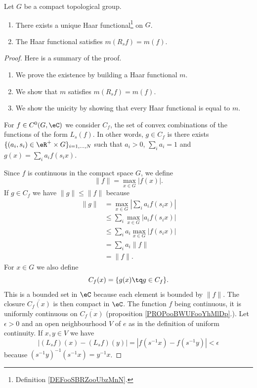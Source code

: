 \begin{theorem}       \label{THOooHZNRooLWmJMB}
	Let \( G\) be a compact topological group.
	\begin{enumerate}
		\item
		      There exists a unique Haar functional\footnote{Definition \ref{DEFooSBRZooUbzMnN}.} on \( G\).
		\item
		      The Haar functional satisfies \( m(R_sf)=m(f)\).
	\end{enumerate}
\end{theorem}

\begin{proof}
	Here is a summary of the proof.
	\begin{enumerate}
		\item
		      We prove the existence by building a Haar functional \( m\).
		\item
		      We show that \( m\) satisfies \( m(R_sf)=m(f)\).
		\item
		      We show the unicity by showing that every Haar functional is equal to \( m\).
	\end{enumerate}

	For \( f\in C^0(G,\eC)\) we consider \( C_f\), the set of convex combinations of the functions of the form \( L_s(f)\). In other words, \( g\in C_f\) is there exists \( \{ (a_i,s_i)\in \eR^+\times G \}_{i=1,\ldots, N}\) such that \( a_i>0\), \( \sum_ia_i=1\) and \( g(x)=\sum_ia_if(s_ix)\).

	Since \( f\) is continuous in the compact space \( G\), we define
	\begin{equation}
		\| f \|=\max_{x\in G}| f(x) |.
	\end{equation}
	If \( g\in C_f\) we have \( \| g \|\leq \| f \|\) because
	\begin{subequations}
		\begin{align}
			\| g \| & =\max_{x\in G}| \sum_ia_if(s_ix) |     \\
			        & \leq\sum_i\max_{x\in G}| a_if(s_ix) |  \\
			        & \leq \sum_ia_i\max_{x\in G}| f(s_ix) | \\
			        & =\sum_ia_i\| f \|                      \\
			        & =\| f \|.
		\end{align}
	\end{subequations}
	For \( x\in G\) we also define
	\begin{equation}
		C_f(x)=\{ g(x)\tq g\in C_f \}.
	\end{equation}
	This is a bounded set in \( \eC\) because each element is bounded by \( \| f \|\). The closure \( \overline{ C_f(x) }\) is then compact in \( \eC\). The function \( f\) being continuous, it is uniformly continuous on \( \overline{ C_f(x) }\) (proposition \ref{PROPooBWUFooYhMlDp}.). Let \( \epsilon>0\) and an open neighbourhood \( V\) of \( e\) as in the definition of uniform continuity. If \( x,y\in V\) we have
	\begin{equation}
		| (L_sf)(x)-(L_sf)(y) |=| f(s^{-1}x)-f(s^{-1} y) |<\epsilon
	\end{equation}
	because \( (s^{-1}y)^{-1}(s^{-1}x)=y^{-1}x\).


\end{proof}
